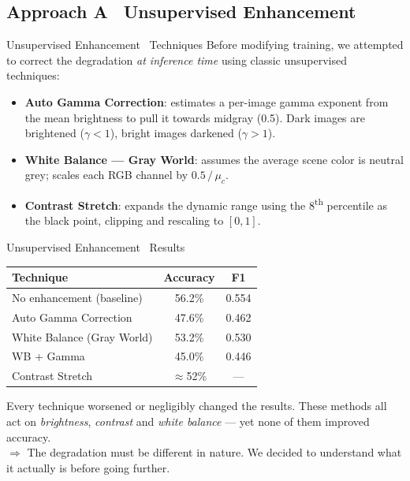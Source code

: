 \subsection{Approach A \textendash\ Unsupervised Enhancement}
\begin{frame}{Unsupervised Enhancement \textendash\ Techniques}
  Before modifying training, we attempted to correct the degradation \textit{at inference time}
  using classic unsupervised techniques:
  \vspace{0.5\baselineskip}
  \begin{itemize}
    \item \textbf{Auto Gamma Correction}: estimates a per-image gamma exponent from the mean
          brightness to pull it towards midgray (0.5).
          Dark images are brightened ($\gamma < 1$), bright images darkened ($\gamma > 1$).
    \item \textbf{White Balance --- Gray World}: assumes the average scene color is neutral grey;
          scales each RGB channel by $0.5\,/\,\mu_c$.
    \item \textbf{Contrast Stretch}: expands the dynamic range using the 8\textsuperscript{th}
          percentile as the black point, clipping and rescaling to $[0, 1]$.
  \end{itemize}
\end{frame}

\begin{frame}{Unsupervised Enhancement \textendash\ Results}
  \begin{center}
    \begin{tabular}{lcc}
      \toprule
      Technique & Accuracy & F1 \\
      \midrule
      No enhancement (baseline) & 56.2\% & 0.554 \\
      Auto Gamma Correction     & 47.6\% & 0.462 \\
      White Balance (Gray World) & 53.2\% & 0.530 \\
      WB + Gamma                & 45.0\% & 0.446 \\
      Contrast Stretch          & $\approx$52\% & --- \\
      \bottomrule
    \end{tabular}
  \end{center}
  \vspace{0.5\baselineskip}
  Every technique worsened or negligibly changed the results.
  These methods all act on \textit{brightness}, \textit{contrast} and \textit{white balance}
  --- yet none of them improved accuracy. \\
  \vspace{0.5\baselineskip}
  $\Rightarrow$ The degradation must be different in nature.
  We decided to understand what it actually is before going further.
\end{frame}

